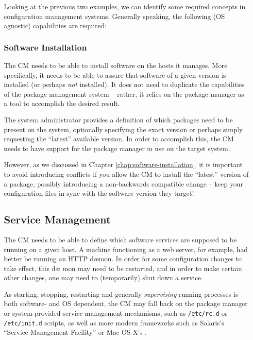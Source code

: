 Looking at the previous two examples, we can identify
some required concepts in configuration management
systems.  Generally speaking, the following (OS
agnostic) capabilities are required:

\subsubsection*{Software Installation}
The CM needs to be able to install software on the
hosts it manages.  More specifically, it needs to be
able to assure that software of a given version is
installed (or perhaps {\em not} installed).  It does
not need to duplicate the capabilities of the package
management system -- rather, it relies on the package
manager as a tool to accomplish the desired result.

The system administrator provides a definition of
which packages need to be present on the system,
optionally specifying the exact version or perhaps
simply requesting the ``latest'' available version.
In order to accomplish this, the CM needs to have
support for the package manager in use on the target
system.

However, as we discussed in Chapter
\ref{chap:software-installation}, it is important to
avoid introducing conflicts if you allow the CM to
install the ``latest'' version of a package, possibly
introducing a non-backwards compatible change -- keep
your configuration files in sync with the software
version they target!

\subsection*{Service Management}

The CM needs to be able to define which software
services are supposed to be running on a given host.
A machine functioning as a web server, for example,
had better be running an HTTP d\ae mon.  In order for
some configuration changes to take effect, this d\ae
mon may need to be restarted, and in order to make
certain other changes, one may need to (temporarily)
shut down a service.

As starting, stopping, restarting and generally {\em
supervising} running processes is both software- and
OS dependent, the CM may fall back on the package
manager or system provided service management
mechanisms, such as {\tt /etc/rc.d} or {\tt
/etc/init.d} scripts, as well as more modern
frameworks such as Solaris's ``Service Management
Facility'' or Mac OS X's .

